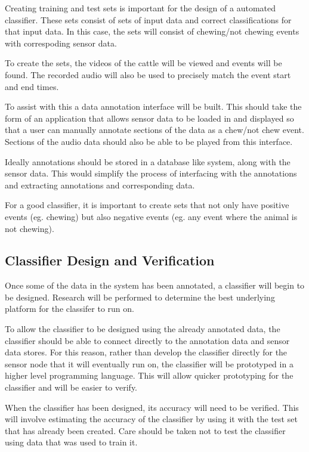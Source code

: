 Creating training and test sets is important for the design of a automated classifier. These sets consist of sets of input data and correct classifications for that input data. In this case, the sets will consist of chewing/not chewing events with correspoding sensor data. 

To create the sets, the videos of the cattle will be viewed and events will be found. The recorded audio will also be used to precisely match the event start and end times.  

To assist with this a data annotation interface  will be built. This should take the form of an application that allows sensor data to be loaded in and displayed so that a user can manually annotate sections of the data as a chew/not chew event. Sections of the audio data should also be able to be played from this interface. 

Ideally annotations should be stored in a database like system, along with the sensor data. This would simplify the process of interfacing with the annotations and extracting annotations and corresponding data. 

For a good classifier, it is important to create sets that not only have positive events (eg. chewing) but also negative events (eg. any event where the animal is not chewing).

\subsection{Classifier Design and Verification} 

Once some of the data in the system has been annotated, a classifier will begin to be designed. Research will be performed to determine the best underlying platform for the classifer to run on. 

To allow the classifier to be designed using the already annotated data, the classifier should be able to connect directly to the annotation data and sensor data stores. For this reason, rather than develop the classifier directly for the sensor node that it will eventually run on, the classifier will be prototyped in a higher level programming language. This will allow quicker prototyping for the classifier and will be easier to verify.

When the classifier has been designed, its accuracy will need to be verified. This will involve estimating the accuracy of the classifier by using it with the test set that has already been created. Care should be taken not to test the classifier using data that was used to train it. 